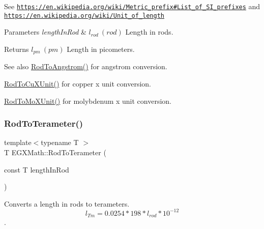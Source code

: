 See \href{https://en.wikipedia.org/wiki/Metric_prefix#List_of_SI_prefixes}{\tt https\+://en.\+wikipedia.\+org/wiki/\+Metric\+\_\+prefix\#\+List\+\_\+of\+\_\+\+S\+I\+\_\+prefixes} and \href{https://en.wikipedia.org/wiki/Unit_of_length}{\tt https\+://en.\+wikipedia.\+org/wiki/\+Unit\+\_\+of\+\_\+length} 
\begin{DoxyParams}{Parameters}
{\em length\+In\+Rod} & $ l_{rod}\ (rod)$ Length in rods. \\
\hline
\end{DoxyParams}
\begin{DoxyReturn}{Returns}
$ l_{pm}\ (pm)$ Length in picometers. 
\end{DoxyReturn}
\begin{DoxySeeAlso}{See also}
\mbox{\hyperlink{group___e_g_x_math-_conversions-_length_conversions-_imperial-_rod-_non-_s_i_ga079b9122c8747685d7057ec05fefdb7f}{Rod\+To\+Angstrom()}} for angstrom conversion. 

\mbox{\hyperlink{group___e_g_x_math-_conversions-_length_conversions-_imperial-_rod-_non-_s_i_gac344dc1fbafaa0451704947bf33a8594}{Rod\+To\+Cu\+X\+Unit()}} for copper x unit conversion. 

\mbox{\hyperlink{group___e_g_x_math-_conversions-_length_conversions-_imperial-_rod-_non-_s_i_gac5c3c27eea891ef32353d16c6b8c57ab}{Rod\+To\+Mo\+X\+Unit()}} for molybdenum x unit conversion. 
\end{DoxySeeAlso}
\mbox{\label{group___e_g_x_math-_conversions-_length_conversions-_imperial-_rod-_s_i_ga3a9ef9cdcea7b3d53cf5020bce58d117}} 
\subsubsection{\texorpdfstring{Rod\+To\+Terameter()}{RodToTerameter()}}
{\footnotesize\ttfamily template$<$typename T $>$ \\
T E\+G\+X\+Math\+::\+Rod\+To\+Terameter (\begin{DoxyParamCaption}\item[{const T}]{length\+In\+Rod }\end{DoxyParamCaption})}



Converts a length in rods to terameters. \[ l_{Tm}=0.0254 * 198 * l_{rod} * 10^{-12} \]. 


